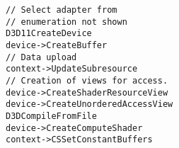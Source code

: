 \lstset{language=C++}
\begin{lstlisting}
// Select adapter from
// enumeration not shown
D3D11CreateDevice
device->CreateBuffer
// Data upload
context->UpdateSubresource
// Creation of views for access.
device->CreateShaderResourceView
device->CreateUnorderedAccessView
D3DCompileFromFile
device->CreateComputeShader
context->CSSetConstantBuffers
\end{lstlisting}